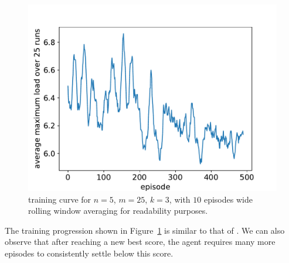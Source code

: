 \begin{figure}[h]
    \centering
    \includegraphics[scale=0.6]{Chapter4/Figs/training_progression_rolling_window_5_25_3.pdf}
    \caption{\KThinning training curve for $n=5$, $m=25$, $k=3$, with $10$ episodes wide rolling window averaging for readability purposes.}
    \label{k-thinning-training-curve}
\end{figure}


The training progression shown in Figure~\ref{k-thinning-training-curve} is similar to that of \TwoThinning. We can also observe that after reaching a new best score, the agent requires many more episodes to consistently settle below this score.
